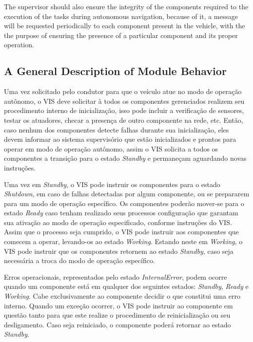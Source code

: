 \documentclass[conference]{IEEEtran}
\begin{document}
The supervisor should also ensure the integrity of the components required to the execution of the tasks during autonomous navigation, because of it, a message will be requested periodically to each component present in the vehicle, with the the purpose of ensuring the presence of a particular component and its proper operation.

%
\subsection{A General Description of Module Behavior}\label{subsec:module_behavior}

Uma vez solicitado pelo condutor para que o veículo atue no modo de operação autônomo, o VIS deve solicitar à todos os componentes gerenciados realizem seu procedimento interno de inicialização, isso pode incluir a verificação de sensores, testar os atuadores, checar a presença de outro componente na rede, etc.
Então, caso nenhum dos componentes detecte falhas durante sua inicialização, eles devem informar ao sistema supervisório que estão inicializados e prontos para operar em modo de operação autônomo, assim o VIS solicita a todos os componentes a transição para o estado \textit{Standby} e permaneçam aguardando novas instruções. 

Uma vez em \textit{Standby}, o VIS pode instruir os componentes para o estado \textit{Shutdown}, em caso de falhas detectadas por algum componente, ou se prepararem para um modo de operação específico. Os componentes poderão mover-se para o estado \textit{Ready} caso tenham realizado seus processos configuração que garantam sua ativação ao modo de operação especificado, conforme instruções do VIS.  Assim que o processo seja cumprido, o VIS pode instruir aos componentes que comecem a operar, levando-os ao estado \textit{Working}. Estando neste em \textit{Working}, o VIS pode instruir que os componentes retornem ao estado \textit{Standby}, caso seja necessária a troca do modo de operação específico.

Erros operacionais, representados pelo estado \textit{InternalError}, podem ocorre quando um componente está em qualquer dos seguintes estados: \textit{Standby}, \textit{Ready} e \textit{Working}. Cabe exclusivamente ao componente decidir o que constitui uma erro interno. Quando um exceção ocorrer, o VIS pode instruir ao componente em questão tanto para que este realize o procedimento de reinicialização ou seu desligamento. Caso seja reiniciado, o componente poderá retornar ao estado \textit{Standby}.
\end{document}
